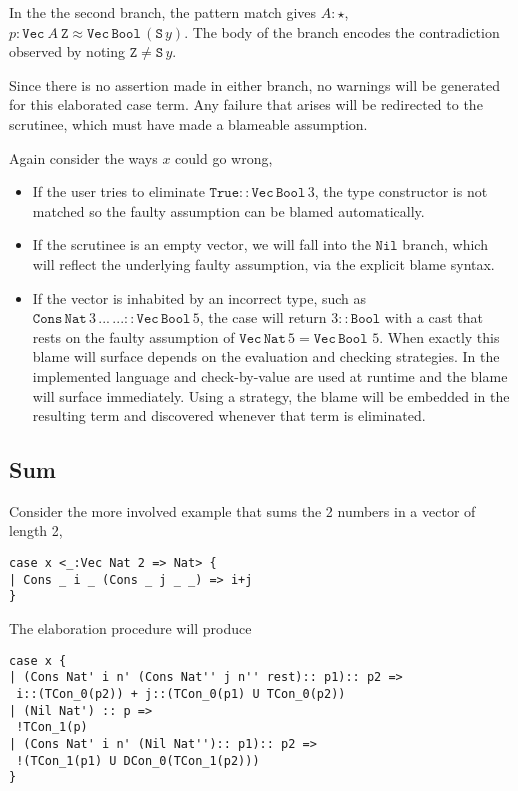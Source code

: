 In the the second branch, the pattern match gives $A:\star$, $p:\mathtt{Vec}\ A\ \mathtt{Z}\approx\mathtt{Vec}\,\mathtt{Bool}\,(\mathtt{S}\,y)$.
The body of the branch encodes the contradiction observed by noting $\mathtt{Z}\neq\mathtt{S}\,y$.
 
Since there is no assertion made in either branch, no warnings will be generated for this elaborated case term.
Any failure that arises will be redirected to the scrutinee, which must have made a blameable assumption.
 
Again consider the ways $x$ could go wrong,
\begin{itemize}
\item
If the user tries to eliminate $\mathtt{True}::\mathtt{Vec}\,\mathtt{Bool}\,3$, the type constructor is not matched so the faulty assumption can be blamed automatically.
\item
If the scrutinee is an empty vector, we will fall into the $\mathtt{Nil}$ branch, which will reflect the underlying faulty assumption, via the explicit blame syntax.
\item
If the vector is inhabited by an incorrect type, such as $\mathtt{Cons}\,\mathtt{Nat}\,3\,...\,...::\mathtt{Vec}\,\mathtt{Bool}\,5$, the case will return $3::\mathtt{Bool}$ with a cast that rests on the faulty assumption of $\mathtt{Vec}\,\mathtt{Nat}\,5=\mathtt{Vec}\,\mathtt{Bool}\,\,5$.
When exactly this blame will surface depends on the evaluation and checking strategies.
In the implemented language \cbv{} and check-by-value are used at runtime and the blame will surface immediately.
Using a \whnf{} strategy, the blame will be embedded in the resulting term and discovered whenever that term is eliminated.
\end{itemize}
 
\subsection{Sum}
 
Consider the more involved example that sums the 2 numbers in a vector of length 2,
 
\begin{lstlisting}[basicstyle={\ttfamily\small}]
case x <_:Vec Nat 2 => Nat> {
| Cons _ i _ (Cons _ j _ _) => i+j
}
\end{lstlisting}
 
The elaboration procedure will produce
 
\begin{lstlisting}[basicstyle={\ttfamily\small}]
case x {
| (Cons Nat' i n' (Cons Nat'' j n'' rest):: p1):: p2 =>
 i::(TCon_0(p2)) + j::(TCon_0(p1) U TCon_0(p2))
| (Nil Nat') :: p =>
 !TCon_1(p)
| (Cons Nat' i n' (Nil Nat''):: p1):: p2 =>
 !(TCon_1(p1) U DCon_0(TCon_1(p2)))
}
\end{lstlisting}
 
